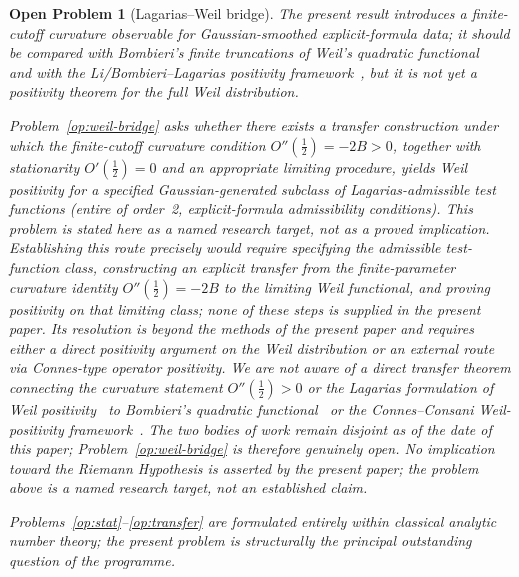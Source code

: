 \documentclass[11pt]{article}
\newtheorem{openproblem}[theorem]{Open Problem}
\begin{document}
\begin{openproblem}[Lagarias--Weil bridge]\label{op:weil}
\label{op:weil-bridge}
The present result introduces a finite-cutoff curvature observable
for Gaussian-smoothed explicit-formula data; it should be compared
with Bombieri's finite truncations of Weil's quadratic
functional~\cite{Bombieri} and with the Li/Bombieri--Lagarias
positivity framework~\cite{Li,BombieriLagarias}, but it is not yet a
positivity theorem for the full Weil distribution.

Problem~\ref{op:weil-bridge} asks whether there exists a transfer
construction under which the finite-cutoff curvature condition
$O''(\tfrac12)=-2B>0$, together with stationarity
$O'(\tfrac12)=0$ and an appropriate limiting procedure, yields
Weil positivity for a specified Gaussian-generated subclass of
Lagarias-admissible test functions
(entire of order~2, explicit-formula admissibility conditions).
This problem is stated here as a named research target, not as a proved implication.
Establishing this route precisely would require specifying the
admissible test-function class, constructing an explicit transfer from
the finite-parameter curvature identity $O''(\tfrac12)=-2B$ to the
limiting Weil functional, and proving positivity on that limiting class;
none of these steps is supplied in the present paper.
Its resolution is beyond the methods of the present paper and requires
either a direct positivity argument on the Weil distribution or an
external route via Connes-type operator positivity.
We are not aware of a direct transfer theorem connecting the
curvature statement $O''(\tfrac12)>0$ or the Lagarias formulation
of Weil positivity~\cite{Lagarias} to Bombieri's quadratic
functional~\cite{Bombieri} or the Connes--Consani
Weil-positivity framework~\cite{ConnesConsani23}.
The two bodies of work remain disjoint as of the date of
this paper; Problem~\ref{op:weil-bridge} is therefore
genuinely open.
No implication toward the Riemann Hypothesis is asserted by the
present paper; the problem above is a named research target,
not an established claim.

Problems~\ref{op:stat}--\ref{op:transfer} are formulated entirely within
classical analytic number theory; the present problem is structurally
the principal outstanding question of the programme.
\end{openproblem}
\end{document}
